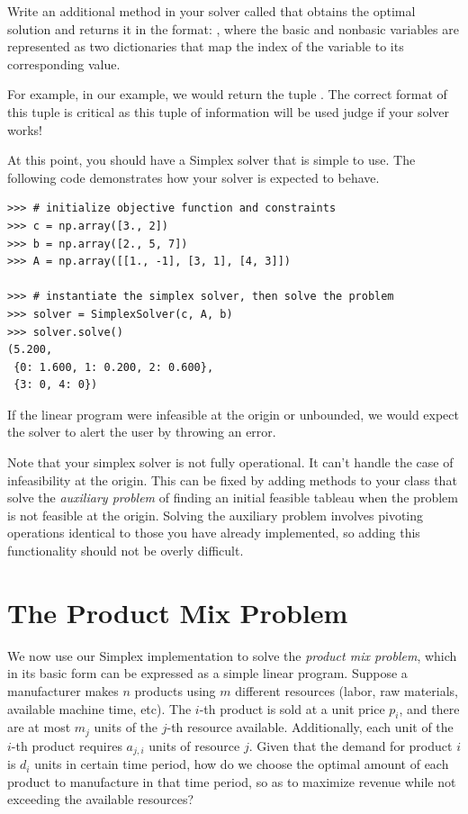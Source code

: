 \begin{problem}
Write an additional method in your solver called  that obtains the optimal solution and returns it in the format: , where the basic and nonbasic variables are represented as two dictionaries that map the index of the variable to
its corresponding value.

For example, in our example, we would return the tuple .
The correct format of this tuple is critical as this tuple of information will be used judge if your solver works!
\end{problem}

At this point, you should have a Simplex solver that is simple to use. The following code demonstrates how your solver is
expected to behave.

\begin{lstlisting}
>>> # initialize objective function and constraints
>>> c = np.array([3., 2])
>>> b = np.array([2., 5, 7])
>>> A = np.array([[1., -1], [3, 1], [4, 3]])

>>> # instantiate the simplex solver, then solve the problem
>>> solver = SimplexSolver(c, A, b)
>>> solver.solve()
(5.200,
 {0: 1.600, 1: 0.200, 2: 0.600},
 {3: 0, 4: 0})
\end{lstlisting}

If the linear program were infeasible at the origin or unbounded, we would expect the solver to alert the user by throwing an error.

Note that your simplex solver is not fully operational. It can't handle the case of infeasibility at the origin. This can be fixed by adding
methods to your class that solve the \emph{auxiliary problem} of finding an initial feasible tableau when the problem is not feasible at the
origin. Solving the auxiliary problem involves pivoting operations identical to those you have already implemented, so adding this functionality
should not be overly difficult.
\section*{The Product Mix Problem}
We now use our Simplex implementation to solve the \emph{product mix problem}, which in its basic form can be expressed as a simple linear program.
Suppose a manufacturer makes $n$ products using $m$ different resources (labor, raw materials, available machine time, etc).
The $i$-th product is sold at a unit price $p_i$, and there are at most $m_j$ units
of the $j$-th resource available. Additionally, each unit of the $i$-th product requires $a_{j,i}$ units of resource $j$.
Given that the demand for product $i$ is $d_i$ units in certain time period, how do we choose the optimal amount
of each product to manufacture in that time period, so as to maximize revenue while not exceeding the available resources?

